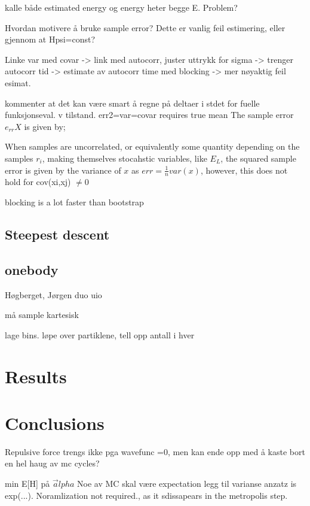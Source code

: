 \documentclass[%
oneside,                 %
final,                   %
10pt]{article}
\begin{document}
kalle både estimated energy og energy heter begge E. Problem?

Hvordan motivere å bruke sample error? Dette er vanlig feil estimering, eller gjennom at Hpsi=const?

Linke var med covar -> link med autocorr, juster uttrykk for sigma -> trenger autocorr tid  -> estimate av autocorr time med blocking -> mer nøyaktig feil esimat.

kommenter at det kan være smart å regne på deltaer i stdet for fuelle funksjonseval. v tilstand.
err2=var=covar requires true mean
The sample error $e_{rr}X$ is given by;

When samples are uncorrelated, or equivalently some quantity depending on the samples $r_i$, making themselves stocahstic variables, like $E_L$, the squared sample error is given by the variance of $x$ as
$err=\frac{1}{n}var(x)$, however, this does not hold for cov(xi,xj) $\neq 0$%

blocking is a lot faster than bootstrap
 
\subsection{Steepest descent} \label{SD}

\subsection{onebody}
Høgberget, Jørgen duo uio

må sample kartesisk

lage bins.
løpe over partiklene, tell opp antall i hver
\section{Results} \label{results}

\section{Conclusions} \label{conclusions}
Repulsive force trengs ikke pga wavefunc =0, men kan ende opp med å kaste bort en hel haug av mc cycles?

min E[H] på $\vec alpha$
Noe av MC skal være expectation
legg til varianse
anzatz is exp(...). Noramlization not required., as it sdissapears in the metropolis step.
 \label{refer}

\end{document}
